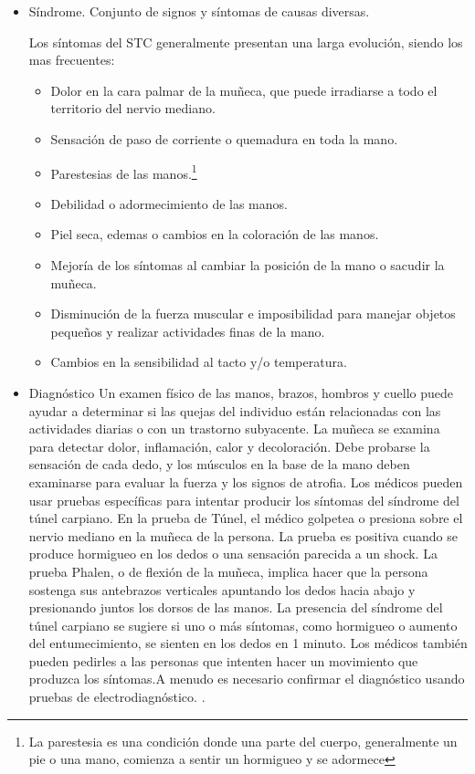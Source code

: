 \documentclass[a4paper,man,natbib]{apa6}
\begin{document}
\begin{itemize}
\item Síndrome.
Conjunto de signos y síntomas de causas diversas. \cite{f9}

Los síntomas del STC generalmente presentan una larga evolución, siendo los mas frecuentes: \cite{f9}
\begin{itemize}
\item Dolor en la cara palmar de la muñeca, que puede irradiarse a todo el territorio del nervio mediano.
\item Sensación de paso de corriente o quemadura en toda la mano.
\item Parestesias de las manos.\footnote{La parestesia es una condición donde una parte del cuerpo, generalmente un pie o una mano, comienza a sentir un hormigueo y se adormece}
\item Debilidad o adormecimiento de las manos.
\item Piel seca, edemas o cambios en la coloración de las manos.
\item Mejoría de los síntomas al cambiar la posición de la mano o sacudir la muñeca.
\item Disminución de la fuerza muscular e imposibilidad para manejar objetos pequeños y realizar actividades finas de la mano.
\item Cambios en la sensibilidad al tacto y/o temperatura.
\end{itemize}
\item Diagnóstico
Un examen físico de las manos, brazos, hombros y cuello puede ayudar a determinar si las quejas del individuo están relacionadas con las actividades diarias o con un trastorno subyacente. La muñeca se examina para detectar dolor, inflamación, calor y decoloración. Debe probarse la sensación de cada dedo, y los músculos en la base de la mano deben examinarse para evaluar la fuerza y los signos de atrofia. Los médicos pueden usar pruebas específicas para intentar producir los síntomas del síndrome del túnel carpiano. En la prueba de Túnel, el médico golpetea o presiona sobre el nervio mediano en la muñeca de la persona. La prueba es positiva cuando se produce hormigueo en los dedos o una sensación parecida a un shock. La prueba Phalen, o de flexión de la muñeca, implica hacer que la persona sostenga sus antebrazos verticales apuntando los dedos hacia abajo y presionando juntos los dorsos de las manos. La presencia del síndrome del túnel carpiano se sugiere si uno o más síntomas, como hormigueo o aumento del entumecimiento, se sienten en los dedos en 1 minuto. Los médicos también pueden pedirles a las personas que intenten hacer un movimiento que produzca los síntomas.A menudo es necesario confirmar el diagnóstico usando pruebas de electrodiagnóstico. \cite{f8}.


\end{itemize}
\end{document}
